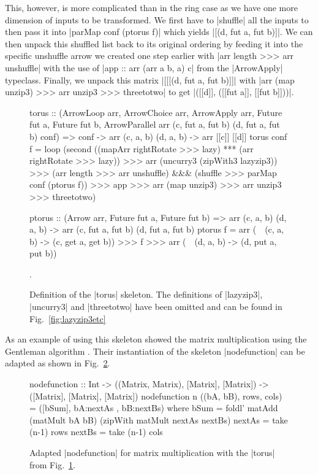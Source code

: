 This, however, is more complicated than in the ring case as we have one more dimension of inputs to be transformed. We first have to |shuffle| all the inputs to then pass it into |parMap conf (ptorus f)| which yields |[(d, fut a, fut b)]|. We can then unpack this shuffled list back to its original ordering by feeding it into the specific unshuffle arrow we created one step earlier with |arr length >>> arr unshuffle| with the use of |app :: arr (arr a b, a) c| from the |ArrowApply| typeclass. Finally, we unpack this matrix |[[[(d, fut a, fut b)]]| with |arr (map unzip3) >>> arr unzip3 >>> threetotwo| to get  |([[d]], ([[fut a]], [[fut b]]))|.

\begin{figure}[h]
\begin{code}
torus :: (ArrowLoop arr, ArrowChoice arr, ArrowApply arr, Future fut a, Future fut b,
          ArrowParallel arr (c, fut a, fut b) (d, fut a, fut b) conf) =>
	conf -> arr (c, a, b) (d, a, b) -> arr [[c]] [[d]]
torus conf f =
	loop (second ((mapArr rightRotate >>> lazy) *** (arr rightRotate >>> lazy)) >>>
	arr (uncurry3 (zipWith3 lazyzip3)) >>>
	(arr length >>> arr unshuffle) &&& (shuffle >>> parMap conf (ptorus f)) >>> app >>>
	arr (map unzip3) >>> arr unzip3 >>> threetotwo)

ptorus :: (Arrow arr, Future fut a, Future fut b) =>
	arr (c, a, b) (d, a, b) -> arr (c, fut a, fut b) (d, fut a, fut b)
ptorus f = arr (\ ~(c, a, b) -> (c, get a, get b)) >>> f >>> arr (\ ~(d, a, b) -> (d, put a, put b))
\end{code} %
\caption{Definition of the |torus| skeleton. The definitions of |lazyzip3|, |uncurry3| and |threetotwo| have been omitted and can be found in Fig.~\ref{fig:lazyzip3etc}}.
\label{fig:torus}
\end{figure}
As an example of using this skeleton \citep{Loogen2012} showed the matrix multiplication using the Gentleman algorithm \citeyear{Gentleman1978}. Their instantiation of the skeleton |nodefunction| can be adapted as shown in Fig.~\ref{fig:torusMatMult}.
\begin{figure}[h]
\begin{code}
nodefunction :: Int -> ((Matrix, Matrix), [Matrix], [Matrix]) -> ([Matrix], [Matrix], [Matrix])
nodefunction n ((bA, bB), rows, cols) = ([bSum], bA:nextAs , bB:nextBs)
		where bSum = foldl' matAdd (matMult bA bB) (zipWith matMult nextAs nextBs)
			     nextAs = take (n-1) rows
			     nextBs = take (n-1) cols
\end{code}
\caption{Adapted |nodefunction| for matrix multiplication with the |torus| from Fig.~\ref{fig:torus}.}
\label{fig:torusMatMult}
\end{figure}
